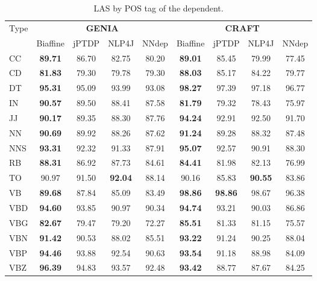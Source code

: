 \documentclass[twocolumn,hyperref]{bmcart}\pdfoutput=1
\begin{document}
\begin{table*}[!t]
\centering
\caption{LAS by POS tag of the dependent.}
\def\arraystretch{1.05}
\begin{tabular}{l|c|c|c|c|c|c|c|c}
\hline
\multirow{2}{*}{Type} & \multicolumn{4}{c|}{\bf GENIA}  & \multicolumn{4}{c}{\bf CRAFT} \\
\cline{2-9}
& Biaffine	& jPTDP	& NLP4J	& NNdep & Biaffine	& jPTDP	& NLP4J	& NNdep\\
\hline
CC	 & \textbf{89.71}	 & 86.70	 & 82.75	 & 80.20	 & \textbf{89.01}	 & 85.45	 & 79.99	 & 77.45 \\
CD	 & \textbf{81.83}	 & 79.30	 & 79.78	 & 79.30	 & \textbf{88.03} & 	85.17 & 	84.22	 & 79.77 \\
DT	 & \textbf{95.31}	 & 95.09	 & 93.99	 & 93.08	 & \textbf{98.27}	 & 97.39	 & 97.18	 & 96.77 \\
IN	 & \textbf{90.57}	 & 89.50	 & 88.41 & 	87.58	 & \textbf{81.79}	 & 79.32	 & 78.43	 & 75.97 \\
JJ	 & \textbf{90.17} & 	89.35 & 	88.30	 & 87.76	 & \textbf{94.24} & 	92.91 & 	92.50 & 	91.70 \\
NN	 & \textbf{90.69}	 & 89.92 & 	88.26 & 	87.62 & 	\textbf{91.24} & 	89.28	 & 88.32 & 	87.48 \\
NNS	 & \textbf{93.31}	 & 92.32 & 	91.33 & 	87.91	 & \textbf{95.07}	 & 92.57	 & 90.91 & 	88.30 \\
RB	 & \textbf{88.31} & 	86.92 & 	87.73 & 	84.61 & 	\textbf{84.41} & 	81.98 & 	82.13	 & 76.99 \\
TO	 & 90.97	 & {91.50}	 & \textbf{92.04} & 88.14 & 	90.16 & 	85.83 & 	\textbf{90.55} & 	83.86 \\
VB	 & \textbf{89.68} & 	87.84 & 	85.09	 & 83.49 & 	\textbf{98.86} & 	\textbf{98.86} & 	98.67	 & 96.38 \\
VBD	 & \textbf{94.60} & 93.85 & 	90.97	 & 90.34	 & \textbf{94.74} & 	93.21 & 	90.03	 & 86.86 \\
VBG	 & \textbf{82.67} & 	79.47 & 	79.20	 & 72.27	 & \textbf{85.51}	 & 81.33 & 	81.15 & 	75.57 \\
VBN	 & \textbf{91.42} & 	90.53 & 	88.02 & 	85.51	 & \textbf{93.22}	 & 91.24	 & 90.25 & 	88.04 \\
VBP	 & \textbf{94.46}	 & 93.88	 & 92.54	 & 90.63	 & \textbf{93.54} & 	91.18	 & 88.98	 & 84.09 \\
VBZ	 & \textbf{96.39} & 	94.83 & 	93.57 & 	92.48 & 	\textbf{93.42} & 	88.77 & 	87.67 & 	84.25 \\
\hline
\end{tabular}
\label{tab:laspos}
\end{table*}
\end{document}
